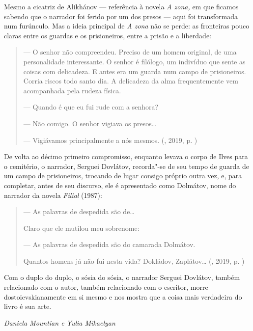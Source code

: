 Mesmo a cicatriz de Alikhánov --- referência à novela \emph{A zona,} em
que ficamos sabendo que o narrador foi ferido por um dos presos --- aqui
foi transformada num furúnculo. Mas a ideia principal de \emph{A zona}
não se perde: as fronteiras pouco claras entre os guardas e os
prisioneiros, entre a prisão e a liberdade:

\begin{quotation}
--- O senhor não compreendeu. Preciso de um homem original, de uma
personalidade interessante. O senhor é filólogo, um indivíduo que sente
as coisas com delicadeza. E antes era um guarda num campo de
prisioneiros. Corria riscos todo santo dia. A delicadeza da alma
frequentemente vem acompanhada pela rudeza física.

--- Quando é que eu fui rude com a senhora?

--- Não comigo. O senhor vigiava os presos\ldots{}

--- Vigiávamos principalmente a nós mesmos. 
{}(, 2019, p. \pageref{ref8})
\end{quotation}

De volta ao décimo primeiro compromisso, enquanto levava o corpo de
Ilves para o cemitério, o narrador, Serguei Dovlátov, recorda"-se de seu
tempo de guarda de um campo de prisioneiros, trocando de lugar consigo
próprio outra vez, e, para completar, antes de seu discurso, ele é
apresentado como Dolmátov, nome do narrador da novela \emph{Filial}
(1987):

\begin{quotation}
--- As palavras de despedida são de\ldots{}

Claro que ele mutilou meu sobrenome:

--- As palavras de despedida são do camarada Dolmátov.

Quantos homens já não fui nesta vida? Dokládov, Zaplátov\ldots{}
{}(, 2019, p. \pageref{ref9})
\end{quotation}

Com o duplo do duplo, o sósia do sósia, o narrador Serguei Dovlátov,
também relacionado com o autor, também relacionado com o escritor, morre
dostoievskianamente em si mesmo e nos mostra que a coisa mais verdadeira
do livro é sua arte.

\vfill
\begin{flushright}
\emph{Daniela Mountian e Yulia Mikaelyan}
\end{flushright}
